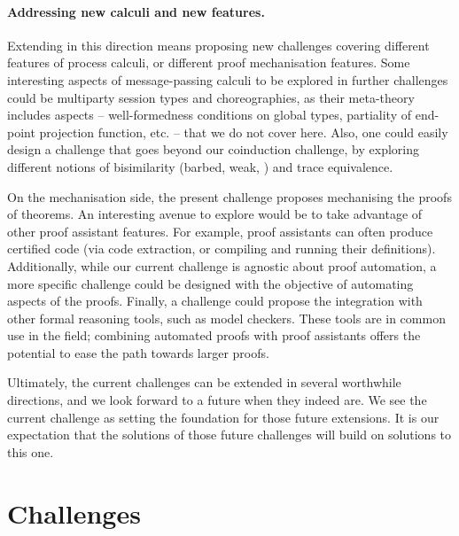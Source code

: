 \documentclass[runningheads]{llncs}
\begin{document}
\vspace{-1mm}%
\paragraph{Addressing new calculi and new features.}
Extending in this direction
means proposing new challenges covering different features of
process calculi, or different proof mechanisation features.
Some interesting aspects of message-passing calculi to be explored in
further challenges could be multiparty session types and
choreographies, as their meta-theory includes aspects -- \eg well-formedness conditions on global types, partiality of end-point projection function, etc. --
that we do not cover here. Also, one could easily
design a challenge that goes beyond our coinduction challenge, by
exploring different notions of bisimilarity (barbed, weak, \etc)
and trace equivalence.

On the mechanisation side, the present challenge proposes mechanising the
proofs of theorems. An interesting avenue to explore would be to take advantage
of other proof assistant features. For example, proof assistants can often
produce certified code (via code extraction, or compiling and running their
definitions). Additionally, while our current challenge is agnostic about proof
automation, a more specific challenge could be designed with the objective of
automating aspects of the proofs. Finally, a challenge could propose the
integration with other formal reasoning tools, such as model checkers. These
tools are in common use in the field; combining automated proofs with
proof assistants offers the potential to ease the path towards larger proofs.

Ultimately, the current challenges can be extended in several
worthwhile directions, and we look forward to a future when they
indeed are. We see the current challenge as setting
the foundation for those future extensions. It is our expectation that
the solutions of those future challenges will build on solutions
to this one.




\clearpage
\appendix
\section{Challenges}\label{app:challenges}

\end{document}

